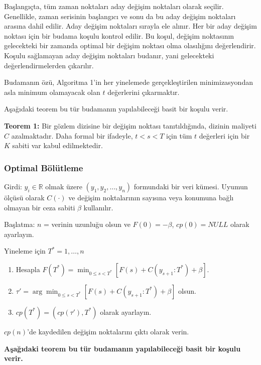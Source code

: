 \documentclass[12pt,twoside]{deuthesis}
\begin{document}
Başlangıçta, tüm zaman noktaları aday değişim noktaları olarak seçilir. Genellikle, zaman serisinin başlangıcı ve sonu da bu aday değişim noktaları arasına dahil edilir. Aday değişim noktaları sırayla ele alınır. Her bir aday değişim noktası için bir budama koşulu kontrol edilir. Bu koşul, değişim noktasının gelecekteki bir zamanda optimal bir değişim noktası olma olasılığını değerlendirir. Koşulu sağlamayan aday değişim noktaları budanır, yani gelecekteki değerlendirmelerden çıkarılır.

Budamanın özü, Algoritma 1'in her yinelemede gerçekleştirilen minimizasyondan asla minimum olamayacak olan \(t\) değerlerini çıkarmaktır.

Aşağıdaki teorem bu tür budamanın yapılabileceği basit bir koşulu verir.

\textbf{Teorem 1:} Bir gözlem dizisine bir değişim noktası tanıtıldığında, dizinin maliyeti \(C\) azalmaktadır. Daha formal bir ifadeyle, \(t < s < T\) için tüm \(t\) değerleri için bir \(K\) sabiti var kabul edilmektedir.

\hypertarget{optimal-buxf6luxfctleme}{%
\subsubsection{Optimal Bölütleme}\label{optimal-buxf6luxfctleme}}

Girdi: \(y_i \in \mathbb{R}\) olmak üzere \((y_1, y_2, \ldots, y_n)\) formundaki bir veri kümesi. Uyumun ölçüsü olarak \(C(\cdot)\) ve değişim noktalarının sayısına veya konumuna bağlı olmayan bir ceza sabiti \(\beta\) kullanılır.

Başlatma: \(n\) = verinin uzunluğu olsun ve \(F(0) = -\beta\), \(cp(0) = NULL\) olarak ayarlayın.

Yineleme için \(T^* = 1, \ldots, n\)

\begin{enumerate}
\def\labelenumi{\arabic{enumi}.}
\item
  Hesapla \(F(T^*) = \min_{0 \leq s < T^*} [F(s) + C(y_{s+1}:T^*) + \beta]\).
\item
  \(\tau' = \arg \min_{0 \leq s < T^*} [F(s) + C(y_{s+1}:T^*) + \beta]\) olsun.
\item
  \(cp(T^*) = (cp(\tau'), T^*)\) olarak ayarlayın.
\end{enumerate}

\(cp(n)\)'de kaydedilen değişim noktalarını çıktı olarak verin.

\textbf{Aşağıdaki teorem bu tür budamanın yapılabileceği basit bir koşulu verir.}
\end{document}
